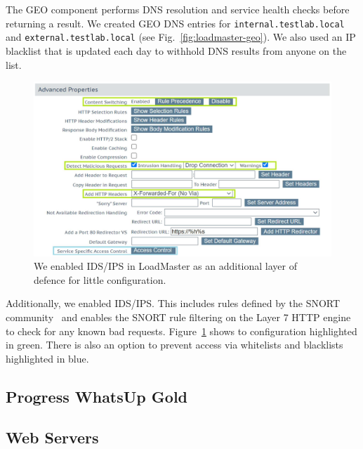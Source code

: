 The GEO component performs DNS resolution and service health checks
before returning a result.  We created GEO DNS entries for
\texttt{internal.testlab.local} and \texttt{external.testlab.local}
(see Fig.~\ref{fig:loadmaster-geo}).  We also used an IP blacklist
that is updated each day to withhold DNS results from anyone on the
list.

\begin{figure}
  \centerline{\includegraphics[width=\columnwidth]{img/loadmaster-ids-ips}}
  \caption{We enabled IDS/IPS in LoadMaster as an additional layer of
    defence for little configuration.}\label{fig:loadmaster-ids-ips}
\end{figure}

Additionally, we enabled IDS/IPS.  This includes rules defined by the
SNORT community~\cite{cisco-snort-xx} and enables the SNORT rule
filtering on the Layer 7 HTTP engine to check for any known bad
requests.  Figure~\ref{fig:loadmaster-ids-ips} shows to configuration
highlighted in green.  There is also an option to prevent access via
whitelists and blacklists highlighted in blue.

\subsection{Progress WhatsUp Gold}

\subsection{Web Servers}
